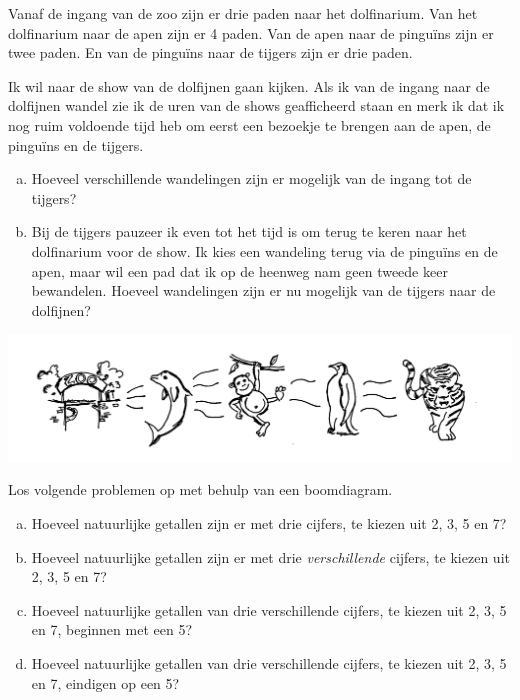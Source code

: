 \documentclass[12pt,a4,twoside]{article}
\begin{document}
\begin{oefening}
Vanaf de ingang van de zoo zijn er drie paden naar het dolfinarium. Van het dolfinarium naar de apen zijn er 4 paden. Van de apen naar de pinguïns zijn er twee paden. En van de pinguïns naar de tijgers zijn er drie paden.

Ik wil naar de show van de dolfijnen gaan kijken. Als ik van de ingang naar de dolfijnen wandel zie ik de uren van de shows geafficheerd staan en merk ik dat ik nog ruim voldoende tijd heb om eerst een bezoekje te brengen aan de apen, de pinguïns en de tijgers.

\begin{enumerate}[(a)]
  \item Hoeveel verschillende wandelingen zijn er mogelijk van de ingang tot de tijgers?
  \item Bij de tijgers pauzeer ik even tot het tijd is om terug te keren naar het dolfinarium voor de show. Ik kies een wandeling terug via de pinguïns en de apen, maar wil een pad dat ik op de heenweg nam geen tweede keer bewandelen. Hoeveel wandelingen zijn er nu mogelijk van de tijgers naar de dolfijnen?
\end{enumerate}
\begin{center}
  \includegraphics[width=\textwidth]{zoodieren}
\end{center}
\end{oefening}

\begin{oefening}
Los volgende problemen op met behulp van een boomdiagram.
\begin{enumerate}[(a)]
  \item Hoeveel natuurlijke getallen zijn er met drie cijfers, te kiezen uit 2, 3, 5 en 7?
  \item Hoeveel natuurlijke getallen zijn er met drie {\em verschillende} cijfers, te kiezen uit 2, 3, 5 en 7?
  \item Hoeveel natuurlijke getallen van drie verschillende cijfers, te kiezen uit 2, 3, 5 en 7, beginnen met een 5?
  \item Hoeveel natuurlijke getallen van drie verschillende cijfers, te kiezen uit 2, 3, 5 en 7, eindigen op een 5?
\end{enumerate}
\end{oefening}
\end{document}
